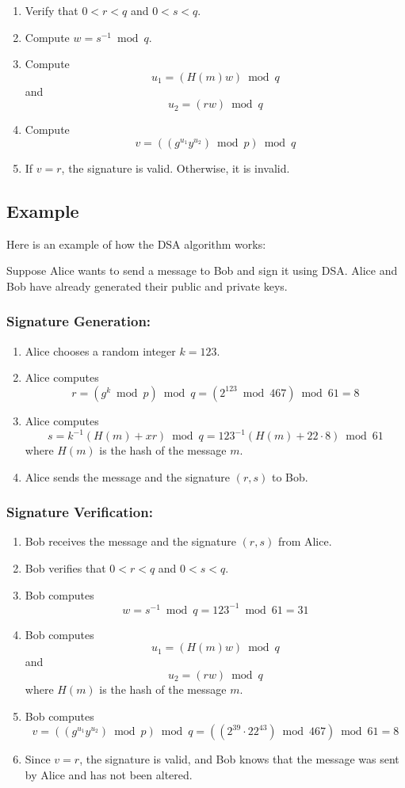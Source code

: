 \documentclass[openany]{book}
\begin{document}
\begin{enumerate}
    \item Verify that $0 < r < q$ and $0 < s < q$.
    \item Compute $w = s^{-1} \bmod q$.
    \item Compute $$u_1 = (H(m)w) \bmod q$$ and $$u_2 = (rw) \bmod q$$
    \item Compute $$v = ((g^{u_1} y^{u_2}) \bmod p) \bmod q$$
    \item If $v = r$, the signature is valid. Otherwise, it is invalid.
\end{enumerate}

\subsection{Example}

Here is an example of how the DSA algorithm works:

Suppose Alice wants to send a message to Bob and sign it using DSA. Alice and Bob have already generated their public and private keys.

\subsubsection{Signature Generation:}

\begin{enumerate}
    \item Alice chooses a random integer $k = 123$.
    \item Alice computes $$r = (g^k \bmod p) \bmod q = (2^{123} \bmod 467) \bmod 61 = 8$$
    \item Alice computes $$s = k^{-1} (H(m) + xr) \bmod q = 123^{-1} (H(m) + 22 \cdot 8) \bmod 61$$ where $H(m)$ is the hash of the message $m$.
    \item Alice sends the message and the signature $(r, s)$ to Bob.
\end{enumerate}

\subsubsection{Signature Verification:}

\begin{enumerate}
    \item Bob receives the message and the signature $(r, s)$ from Alice.
    \item Bob verifies that $0 < r < q$ and $0 < s < q$.
    \item Bob computes $$w = s^{-1} \bmod q = 123^{-1} \bmod 61 = 31$$
    \item Bob computes $$u_1 = (H(m)w) \bmod q$$ and $$u_2 = (rw) \bmod q$$where $H(m)$ is the hash of the message $m$.
    \item Bob computes $$v = ((g^{u_1} y^{u_2}) \bmod p) \bmod q = ((2^{39} \cdot 22^{43}) \bmod 467) \bmod 61 = 8$$
    \item Since $v = r$, the signature is valid, and Bob knows that the message was sent by Alice and has not been altered.
\end{enumerate}
\end{document}
